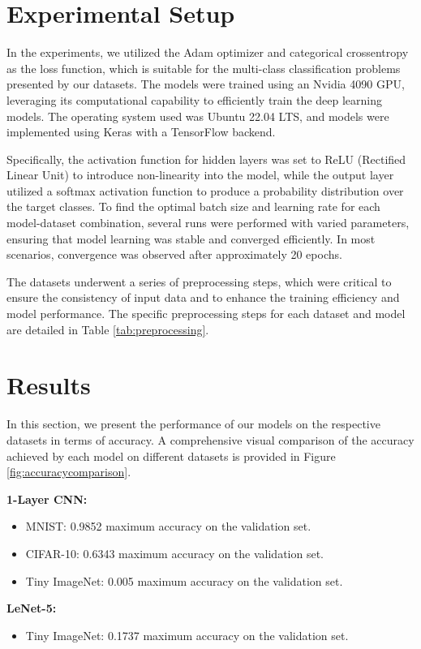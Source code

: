 \documentclass[letterpaper]{article}
\begin{document}
\section{Experimental Setup}
In the experiments, we utilized the Adam optimizer and categorical crossentropy as the loss function, which is suitable for the multi-class classification problems presented by our datasets. The models were trained using an Nvidia 4090 GPU, leveraging its computational capability to efficiently train the deep learning models. The operating system used was Ubuntu 22.04 LTS, and models were implemented using Keras with a TensorFlow backend. 

Specifically, the activation function for hidden layers was set to ReLU (Rectified Linear Unit) to introduce non-linearity into the model, while the output layer utilized a softmax activation function to produce a probability distribution over the target classes. To find the optimal batch size and learning rate for each model-dataset combination, several runs were performed with varied parameters, ensuring that model learning was stable and converged efficiently. In most scenarios, convergence was observed after approximately 20 epochs.

The datasets underwent a series of preprocessing steps, which were critical to ensure the consistency of input data and to enhance the training efficiency and model performance. The specific preprocessing steps for each dataset and model are detailed in Table \ref{tab:preprocessing}. 

\section{Results}

In this section, we present the performance of our models on the respective datasets in terms of accuracy. A comprehensive visual comparison of the accuracy achieved by each model on different datasets is provided in Figure \ref{fig:accuracycomparison}.

\textbf{1-Layer CNN:} 
\begin{itemize}
    \item MNIST: 0.9852 maximum accuracy on the validation set.
    \item CIFAR-10: 0.6343 maximum accuracy on the validation set.
    \item Tiny ImageNet: 0.005 maximum accuracy on the validation set.
\end{itemize}

\textbf{LeNet-5:} 
\begin{itemize}
    \item Tiny ImageNet: 0.1737 maximum accuracy on the validation set.
\end{itemize}
\end{document}
